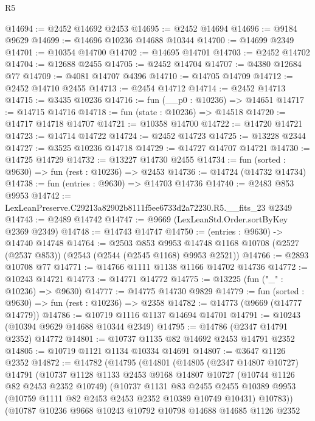 \begin{lexlean}{R5}
\begin{coremodule}
@14694 := @2452 @14692 @2453
@14695 := @2452 @14694
@14696 := @9184 @9629
@14699 := @14696 @10236 @14688 @10344
@14700 := @14699 @2349
@14701 := @10354 @14700
@14702 := @14695 @14701
@14703 := @2452 @14702
@14704 := @12688 @2455
@14705 := @2452 @14704
@14707 := @4380 @12684 @77
@14709 := @4081 @14707 @4396
@14710 := @14705 @14709
@14712 := @2452 @14710 @2455
@14713 := @2454 @14712
@14714 := @2452 @14713
@14715 := @3435 @10236
@14716 := fun (__p0 : @10236) => @14651
@14717 := @14715 @14716
@14718 := fun (state : @10236) => @14518
@14720 := @14717 @14718 @14707
@14721 := @10358 @14700
@14722 := @14720 @14721
@14723 := @14714 @14722
@14724 := @2452 @14723
@14725 := @13228 @2344
@14727 := @3525 @10236 @14718
@14729 := @14727 @14707 @14721
@14730 := @14725 @14729
@14732 := @13227 @14730 @2455
@14734 := fun (sorted : @9630) => fun (rest : @10236) => @2453
@14736 := @14724 (@14732 @14734)
@14738 := fun (entries : @9630) => @14703 @14736
@14740 := @2483 @853 @9953
@14742 := LexLeanPreserve.C29213a82902b8111f5ee6733d2a72230.R5.__fits_23 @2349
@14743 := @2489 @14742
@14747 := @9669 (LexLeanStd.Order.sortByKey @2369 @2349)
@14748 := @14743 @14747
@14750 := (entries : @9630) -> @14740 @14748
@14764 := @2503
    @853
    @9953
    @14748
    @1168
    @10708
    (@2527 (@2537 @853))
    (@2543 (@2544 (@2545 @1168) @9953 @2521))
@14766 := @2893 @10708 @77
@14771 := @14766 @1111 @1138 @1166 @14702 @14736
@14772 := @10243 @14721
@14773 := @14771 @14772
@14775 := @13225 (fun ("_" : @10236) => @9630)
@14777 := @14775 @14730 @9829
@14779 := fun (sorted : @9630) => fun (rest : @10236) => @2358
@14782 := @14773 (@9669 (@14777 @14779))
@14786 := @10719 @1116 @1137 @14694 @14701
@14791 := @10243 (@10394 @9629 @14688 @10344 @2349)
@14795 := @14786 (@2347 @14791 @2352) @14772
@14801 := @10737 @1135 @82 @14692 @2453 @14791 @2352
@14805 := @10719 @1121 @1134 @10334 @14691
@14807 := @3647 @1126 @2352
@14872 := @14782
    (@14795
      (@14801
        (@14805
          (@2347 @14807 @10727)
          @14791
          (@10737
            @1128
            @1133
            @2453
            @9168
            @14807
            @10727
            (@10744 @1126 @82 @2453 @2352 @10749)
            (@10737
              @1131
              @83
              @2455
              @2455
              @10389
              @9953
              (@10759 @1111 @82 @2453 @2453 @2352 @10389 @10749 @10431)
              @10783))
          (@10787
            @10236
            @9668
            @10243
            @10792
            @10798
            @14688
            @14685
            @1126
            @2352

\end{coremodule}
\end{lexlean}
